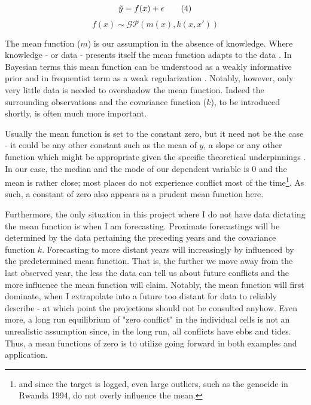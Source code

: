 \documentclass[a4paper]{article}
\begin{document}
\[
\Tilde{y} = f(x) + \epsilon  \tag{4} \label{eq:y}
\]
\[
f(x) \sim \mathcal{GP}(m(x),k(x,x'))  \tag{5} \label{eq:f}
\]

The mean function ($m$) is our assumption in the absence of knowledge. Where knowledge - or data - presents itself the mean function adapts to the data \citep[3-4]{williams2006gaussian}. In Bayesian terms this mean function can be understood as a weakly informative prior and in frequentist term as a weak regularization \citep[35]{Mcelreath_2018}. Notably, however, only very little data is needed to overshadow the mean function. Indeed the surrounding observations and the covariance function ($k$), to be introduced shortly, is often much more important.\par

Usually the mean function is set to the constant zero, but it need not be the case - it could be any other constant such as the mean of $y$, a slope or any other function which might be appropriate given the specific theoretical underpinnings \citep[28-29]{williams2006gaussian}. In our case, the median and the mode of our dependent variable is 0 and the mean is rather close; most places do not experience conflict most of the time\footnote{and since the target is logged, even large outliers, such as the genocide in Rwanda 1994, do not overly influence the mean.}. As such, a constant of zero also appears as a prudent mean function here.\par

Furthermore, the only situation in this project where I do not have data dictating the mean function is when I am forecasting. Proximate forecastings will be determined by the data pertaining the preceding years and the covariance function $k$. Forecasting to more distant years will increasingly by influenced by the predetermined mean function. That is, the further we move away from the last observed year, the less the data can tell us about future conflicts and the more influence the mean function will claim. Notably, the mean function will first dominate, when I extrapolate into a future too distant for data to reliably describe - at which point the projections should not be consulted anyhow. Even more, a long run equilibrium of "zero conflict" in the individual cells is not an unrealistic assumption since, in the long run, all conflicts have ebbs and tides. Thus, a mean functions of zero is to utilize going forward in both examples and application.\par
\end{document}
